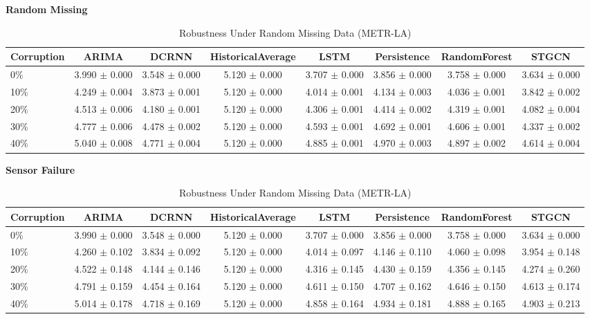 \begin{table}[ht]
\centering
\caption{Robustness Under Random Missing Data (METR-LA)}
\label{tab:robustness}
\textbf{Random Missing}

\begin{tabular}{lccccccc}
\toprule
Corruption & ARIMA & DCRNN & HistoricalAverage & LSTM & Persistence & RandomForest & STGCN \\
\midrule
0\% & 3.990 $\pm$ 0.000 & 3.548 $\pm$ 0.000 & 5.120 $\pm$ 0.000 & 3.707 $\pm$ 0.000 & 3.856 $\pm$ 0.000 & 3.758 $\pm$ 0.000 & 3.634 $\pm$ 0.000 \\
10\% & 4.249 $\pm$ 0.004 & 3.873 $\pm$ 0.001 & 5.120 $\pm$ 0.000 & 4.014 $\pm$ 0.001 & 4.134 $\pm$ 0.003 & 4.036 $\pm$ 0.001 & 3.842 $\pm$ 0.002 \\
20\% & 4.513 $\pm$ 0.006 & 4.180 $\pm$ 0.001 & 5.120 $\pm$ 0.000 & 4.306 $\pm$ 0.001 & 4.414 $\pm$ 0.002 & 4.319 $\pm$ 0.001 & 4.082 $\pm$ 0.004 \\
30\% & 4.777 $\pm$ 0.006 & 4.478 $\pm$ 0.002 & 5.120 $\pm$ 0.000 & 4.593 $\pm$ 0.001 & 4.692 $\pm$ 0.001 & 4.606 $\pm$ 0.001 & 4.337 $\pm$ 0.002 \\
40\% & 5.040 $\pm$ 0.008 & 4.771 $\pm$ 0.004 & 5.120 $\pm$ 0.000 & 4.885 $\pm$ 0.001 & 4.970 $\pm$ 0.003 & 4.897 $\pm$ 0.002 & 4.614 $\pm$ 0.004 \\
\bottomrule
\end{tabular}

\textbf{Sensor Failure}

\begin{tabular}{lccccccc}
\toprule
Corruption & ARIMA & DCRNN & HistoricalAverage & LSTM & Persistence & RandomForest & STGCN \\
\midrule
0\% & 3.990 $\pm$ 0.000 & 3.548 $\pm$ 0.000 & 5.120 $\pm$ 0.000 & 3.707 $\pm$ 0.000 & 3.856 $\pm$ 0.000 & 3.758 $\pm$ 0.000 & 3.634 $\pm$ 0.000 \\
10\% & 4.260 $\pm$ 0.102 & 3.834 $\pm$ 0.092 & 5.120 $\pm$ 0.000 & 4.014 $\pm$ 0.097 & 4.146 $\pm$ 0.110 & 4.060 $\pm$ 0.098 & 3.954 $\pm$ 0.148 \\
20\% & 4.522 $\pm$ 0.148 & 4.144 $\pm$ 0.146 & 5.120 $\pm$ 0.000 & 4.316 $\pm$ 0.145 & 4.430 $\pm$ 0.159 & 4.356 $\pm$ 0.145 & 4.274 $\pm$ 0.260 \\
30\% & 4.791 $\pm$ 0.159 & 4.454 $\pm$ 0.164 & 5.120 $\pm$ 0.000 & 4.611 $\pm$ 0.150 & 4.707 $\pm$ 0.162 & 4.646 $\pm$ 0.150 & 4.613 $\pm$ 0.174 \\
40\% & 5.014 $\pm$ 0.178 & 4.718 $\pm$ 0.169 & 5.120 $\pm$ 0.000 & 4.858 $\pm$ 0.164 & 4.934 $\pm$ 0.181 & 4.888 $\pm$ 0.165 & 4.903 $\pm$ 0.213 \\
\bottomrule
\end{tabular}

\end{table}
